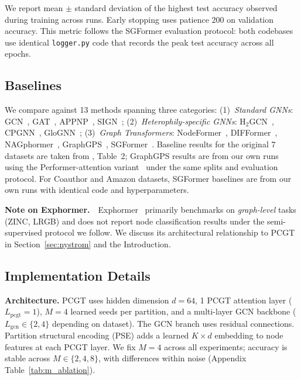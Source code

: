 \documentclass[sigconf]{acmart}
\begin{document}
We report mean $\pm$ standard deviation of the highest test accuracy observed during training across runs. Early stopping uses patience 200 on validation accuracy. This metric follows the SGFormer evaluation protocol: both codebases use identical \texttt{logger.py} code that records the peak test accuracy across all epochs.

\subsection{Baselines}

We compare against 13 methods spanning three categories: (1)~\emph{Standard GNNs}: GCN~\citep{kipf2017semi}, GAT~\citep{velickovic2018gat}, APPNP~\citep{klicpera2019appnp}, SIGN~\citep{rossi2020sign}; (2)~\emph{Heterophily-specific GNNs}: H$_2$GCN~\citep{zhu2020h2gcn}, CPGNN~\citep{zhu2021cpgnn}, GloGNN~\citep{li2022glognn}; (3)~\emph{Graph Transformers}: NodeFormer~\citep{wu2022nodeformer}, DIFFormer~\citep{wu2023difformer}, NAGphormer~\citep{chen2023nagphormer}, GraphGPS~\citep{rampasek2022graphgps}, SGFormer~\citep{wu2023sgformer}. Baseline results for the original 7 datasets are taken from \citet{wu2023sgformer}, Table~2; GraphGPS results are from our own runs using the Performer-attention variant~\citep{rampasek2022graphgps} under the same splits and evaluation protocol. For Coauthor and Amazon datasets, SGFormer baselines are from our own runs with identical code and hyperparameters.

\noindent\textbf{Note on Exphormer.}~~Exphormer~\citep{shirzad2023exphormer} primarily benchmarks on \emph{graph-level} tasks (ZINC, LRGB) and does not report node classification results under the semi-supervised protocol we follow. We discuss its architectural relationship to PCGT in Section~\ref{sec:nystrom} and the Introduction.

\subsection{Implementation Details}

\textbf{Architecture.} PCGT uses hidden dimension $d=64$, 1 PCGT attention layer ($L_\text{pcgt}=1$), $M=4$ learned seeds per partition, and a multi-layer GCN backbone ($L_\text{gcn} \in \{2, 4\}$ depending on dataset). The GCN branch uses residual connections. Partition structural encoding (PSE) adds a learned $K \times d$ embedding to node features at each PCGT layer. We fix $M=4$ across all experiments; accuracy is stable across $M \in \{2, 4, 8\}$, with differences within noise (Appendix Table~\ref{tab:m_ablation}).
\end{document}
